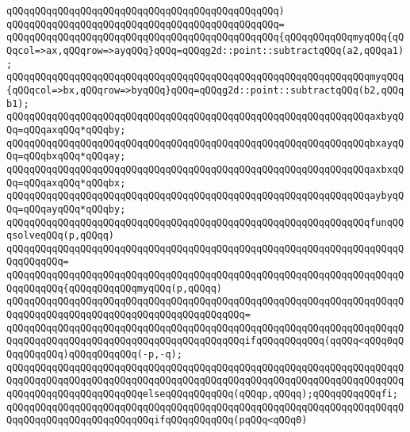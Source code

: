 \verb|qQQqqQQqqQQqqQQqqQQqqQQqqQQqqQQqqQQqqQQqqQQqqQQq)|\newline
\verb|qQQqqQQqqQQqqQQqqQQqqQQqqQQqqQQqqQQqqQQqqQQqqQQq=|\newline
\verb|qQQqqQQqqQQqqQQqqQQqqQQqqQQqqQQqqQQqqQQqqQQqqQQq{qQQqqQQqqQQqmyqQQq{qQQqcol=>ax,qQQqrow=>ayqQQq}qQQq=qQQqg2d::point::subtractqQQq(a2,qQQqa1);|\newline
\verb|qQQqqQQqqQQqqQQqqQQqqQQqqQQqqQQqqQQqqQQqqQQqqQQqqQQqqQQqqQQqqQQqmyqQQq{qQQqcol=>bx,qQQqrow=>byqQQq}qQQq=qQQqg2d::point::subtractqQQq(b2,qQQqb1);|\newline
\newline
\verb|qQQqqQQqqQQqqQQqqQQqqQQqqQQqqQQqqQQqqQQqqQQqqQQqqQQqqQQqqQQqqQQqaxbyqQQq=qQQqaxqQQq*qQQqby;|\newline
\verb|qQQqqQQqqQQqqQQqqQQqqQQqqQQqqQQqqQQqqQQqqQQqqQQqqQQqqQQqqQQqqQQqbxayqQQq=qQQqbxqQQq*qQQqay;|\newline
\verb|qQQqqQQqqQQqqQQqqQQqqQQqqQQqqQQqqQQqqQQqqQQqqQQqqQQqqQQqqQQqqQQqaxbxqQQq=qQQqaxqQQq*qQQqbx;|\newline
\verb|qQQqqQQqqQQqqQQqqQQqqQQqqQQqqQQqqQQqqQQqqQQqqQQqqQQqqQQqqQQqqQQqaybyqQQq=qQQqayqQQq*qQQqby;|\newline
\newline
\verb|qQQqqQQqqQQqqQQqqQQqqQQqqQQqqQQqqQQqqQQqqQQqqQQqqQQqqQQqqQQqqQQqfunqQQqsolveqQQq(p,qQQqq)|\newline
\verb|qQQqqQQqqQQqqQQqqQQqqQQqqQQqqQQqqQQqqQQqqQQqqQQqqQQqqQQqqQQqqQQqqQQqqQQqqQQqqQQq=|\newline
\verb|qQQqqQQqqQQqqQQqqQQqqQQqqQQqqQQqqQQqqQQqqQQqqQQqqQQqqQQqqQQqqQQqqQQqqQQqqQQqqQQq{qQQqqQQqqQQqmyqQQq(p,qQQqq)|\newline
\verb|qQQqqQQqqQQqqQQqqQQqqQQqqQQqqQQqqQQqqQQqqQQqqQQqqQQqqQQqqQQqqQQqqQQqqQQqqQQqqQQqqQQqqQQqqQQqqQQqqQQqqQQqqQQqqQQq=|\newline
\verb|qQQqqQQqqQQqqQQqqQQqqQQqqQQqqQQqqQQqqQQqqQQqqQQqqQQqqQQqqQQqqQQqqQQqqQQqqQQqqQQqqQQqqQQqqQQqqQQqqQQqqQQqqQQqqQQqifqQQqqQQqqQQq(qqQQq<qQQq0qQQqqQQqqQQq)qQQqqQQqqQQq(-p,-q);|\newline
\verb|qQQqqQQqqQQqqQQqqQQqqQQqqQQqqQQqqQQqqQQqqQQqqQQqqQQqqQQqqQQqqQQqqQQqqQQqqQQqqQQqqQQqqQQqqQQqqQQqqQQqqQQqqQQqqQQqqQQqqQQqqQQqqQQqqQQqqQQqqQQqqQQqqQQqqQQqqQQqqQQqqQQqelseqQQqqQQqqQQq(qQQqp,qQQqq);qQQqqQQqqQQqfi;|\newline
\newline
\verb|qQQqqQQqqQQqqQQqqQQqqQQqqQQqqQQqqQQqqQQqqQQqqQQqqQQqqQQqqQQqqQQqqQQqqQQqqQQqqQQqqQQqqQQqqQQqqQQqifqQQqqQQqqQQq(pqQQq<qQQq0)|\newline

